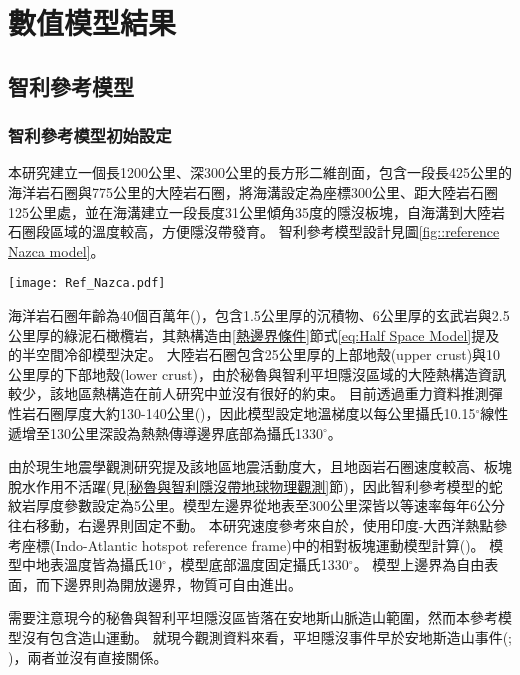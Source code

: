 
\chapter{數值模型結果}

\section{智利參考模型}
\subsection{智利參考模型初始設定}\label{智利參考模型初始模型設定}
本研究建立一個長1200公里、深300公里的長方形二維剖面，包含一段長425公里的海洋岩石圈與775公里的大陸岩石圈，將海溝設定為座標300公里、距大陸岩石圈125公里處，並在海溝建立一段長度31公里傾角35度的隱沒板塊，自海溝到大陸岩石圈段區域的溫度較高，方便隱沒帶發育。
智利參考模型設計見圖\ref{fig::reference Nazca model}。

\begin{figure*}[hb]
    \centering
    \texttt{[image: Ref\_Nazca.pdf]}
    \caption[智利參考模型設計與邊界條件示意圖]{智利參考模型設計與邊界條件示意圖}
    \label{fig::reference Nazca model}
\end{figure*}

海洋岩石圈年齡為40個百萬年(\citealp{muller2019})，包含1.5公里厚的沉積物、6公里厚的玄武岩與2.5公里厚的綠泥石橄欖岩，其熱構造由\ref{熱邊界條件}節式\ref{eq:Half Space Model}提及的半空間冷卻模型決定。
大陸岩石圈包含25公里厚的上部地殼(upper crust)與10公里厚的下部地殼(lower crust)，由於秘魯與智利平坦隱沒區域的大陸熱構造資訊較少，該地區熱構造在前人研究中並沒有很好的約束。
目前透過重力資料推測彈性岩石圈厚度大約130-140公里(\citealp{perez2008})，因此模型設定地溫梯度以每公里攝氏10.15$^{\circ}$線性遞增至130公里深設為熱熱傳導邊界底部為攝氏1330$^{\circ}$。

由於現生地震學觀測研究提及該地區地震活動度大，且地函岩石圈速度較高、板塊脫水作用不活躍(見\ref{秘魯與智利隱沒帶地球物理觀測}節)，因此智利參考模型的蛇紋岩厚度參數設定為5公里。模型左邊界從地表至300公里深皆以等速率每年6公分往右移動，右邊界則固定不動。
本研究速度參考來自於\citet{o2005uncertainties}，使用印度-大西洋熱點參考座標(Indo-Atlantic hotspot reference frame)中的相對板塊運動模型計算(\citealp{schellart2008global})。
模型中地表溫度皆為攝氏10$^{\circ}$，模型底部溫度固定攝氏1330$^{\circ}$。
模型上邊界為自由表面，而下邊界則為開放邊界，物質可自由進出。

需要注意現今的秘魯與智利平坦隱沒區皆落在安地斯山脈造山範圍，然而本參考模型沒有包含造山運動。
就現今觀測資料來看，平坦隱沒事件早於安地斯造山事件(\citealp{chen2019southward}; \citealp{hu2021southward})，兩者並沒有直接關係。


